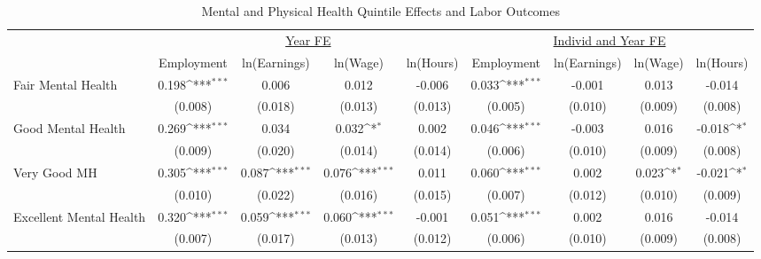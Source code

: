 \documentclass[border=3mm,preview]{standalone}
\begin{document}
\begin{landscape}
\def\sym#1{\ifmmode^{#1}\else\(^{#1}\)\fi}
\begin{table}
\center\caption{Mental and Physical Health Quintile Effects and Labor Outcomes}
\footnotesize
\begin{tabular}{l*{8}{c}}
                    &\multicolumn{4}{c}{\underline{Year FE}}                                                &\multicolumn{4}{c}{\underline{Individ and Year FE}}                                    \\\cmidrule(lr){2-5}\cmidrule(lr){6-9}
                    &\multicolumn{1}{c}{Employment}&\multicolumn{1}{c}{ln(Earnings)}&\multicolumn{1}{c}{ln(Wage)}&\multicolumn{1}{c}{ln(Hours)}&\multicolumn{1}{c}{Employment}&\multicolumn{1}{c}{ln(Earnings)}&\multicolumn{1}{c}{ln(Wage)}&\multicolumn{1}{c}{ln(Hours)}\\
\hline
Fair Mental Health  &       0.198\sym{***}&       0.006         &       0.012         &      -0.006         &       0.033\sym{***}&      -0.001         &       0.013         &      -0.014         \\
                    &     (0.008)         &     (0.018)         &     (0.013)         &     (0.013)         &     (0.005)         &     (0.010)         &     (0.009)         &     (0.008)         \\
Good Mental Health  &       0.269\sym{***}&       0.034         &       0.032\sym{*}  &       0.002         &       0.046\sym{***}&      -0.003         &       0.016         &      -0.018\sym{*}  \\
                    &     (0.009)         &     (0.020)         &     (0.014)         &     (0.014)         &     (0.006)         &     (0.010)         &     (0.009)         &     (0.008)         \\
Very Good MH        &       0.305\sym{***}&       0.087\sym{***}&       0.076\sym{***}&       0.011         &       0.060\sym{***}&       0.002         &       0.023\sym{*}  &      -0.021\sym{*}  \\
                    &     (0.010)         &     (0.022)         &     (0.016)         &     (0.015)         &     (0.007)         &     (0.012)         &     (0.010)         &     (0.009)         \\
Excellent Mental Health&       0.320\sym{***}&       0.059\sym{***}&       0.060\sym{***}&      -0.001         &       0.051\sym{***}&       0.002         &       0.016         &      -0.014         \\
                    &     (0.007)         &     (0.017)         &     (0.013)         &     (0.012)         &     (0.006)         &     (0.010)         &     (0.009)         &     (0.008)         \\

\end{tabular}
\end{table}
\end{landscape}
\end{document}
